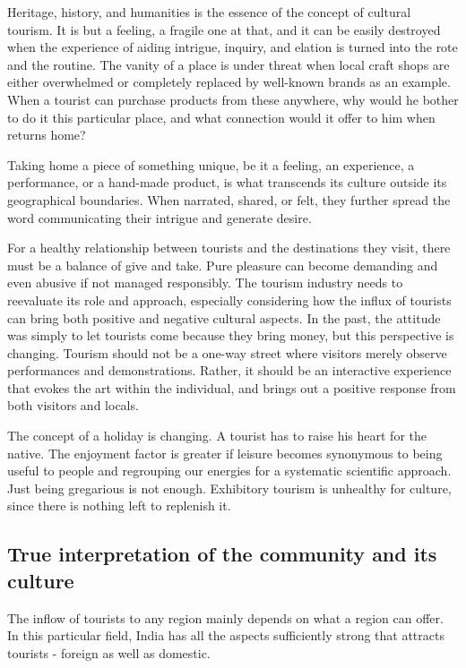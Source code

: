 Heritage, history, and humanities is the essence of the concept of cultural tourism. It is but a feeling, a fragile one at that, and it can be easily destroyed when the experience of aiding intrigue, inquiry, and elation is turned into the rote and the routine. The vanity of a place is under threat when local craft shops are either overwhelmed or completely replaced by well-known brands as an example. When a tourist can purchase products from these anywhere, why would he bother to do it this particular place, and what connection would it offer to him when returns home?

Taking home a piece of something unique, be it a feeling, an experience, a performance, or a hand-made product, is what transcends its culture outside its geographical boundaries. When narrated, shared, or felt, they further spread the word communicating their intrigue and generate desire.

For a healthy relationship between tourists and the destinations they visit, there must be a balance of give and take. Pure pleasure can become demanding and even abusive if not managed responsibly. The tourism industry needs to reevaluate its role and approach, especially considering how the influx of tourists can bring both positive and negative cultural aspects. In the past, the attitude was simply to let tourists come because they bring money, but this perspective is changing. Tourism should not be a one-way street where visitors merely observe performances and demonstrations. Rather, it should be an interactive experience that evokes the art within the individual, and brings out a positive response from both visitors and locals.

The concept of a holiday is changing. A tourist has to raise his heart for the native. The enjoyment factor is greater if leisure becomes synonymous to being useful to people and regrouping our energies for a systematic scientific approach. Just being gregarious is not enough. Exhibitory tourism is unhealthy for culture, since there is nothing left to replenish it.


\subsection{True interpretation of the community and its culture} %
\label{sub:tic}

The inflow of tourists to any region mainly depends on what a region can offer. In this particular field, India has all the aspects sufficiently strong that attracts tourists - foreign as well as domestic.


